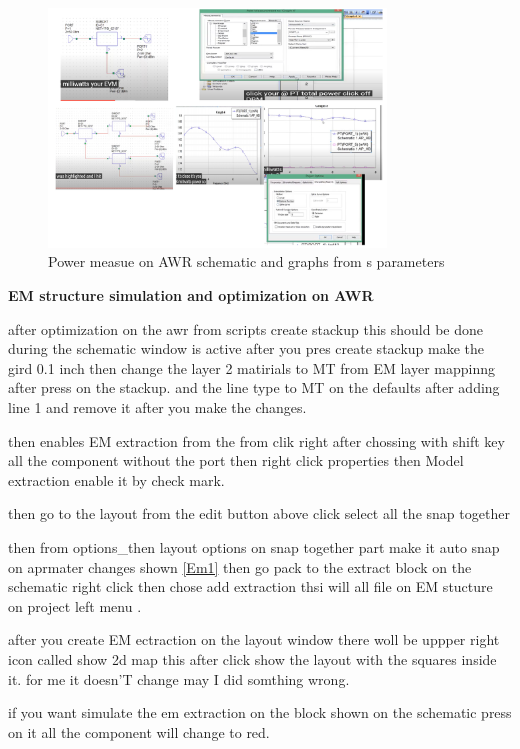 \documentclass{article}
\begin{document}
\begin{itemize}
\begin{figure}[H]
    \centering
    \includegraphics[width=0.8\textwidth]{figures/power  ports 1.pdf}
    \caption{Power measue on AWR schematic and graphs from s parameters}
    \label{power1}
\end{figure}



\textbf{EM structure simulation  and optimization on AWR}

after optimization on the awr from scripts create stackup this should be  done during the schematic window is active
after you pres create stackup 
make the gird 0.1 inch  then change the layer 2 matirials to MT from EM layer mappinng after press on the stackup.
and the line type to MT on the defaults after adding line 1 and remove it after you make the changes.

then enables EM extraction from the  from clik right after chossing with shift key all the component without the port 
then right click properties then Model extraction enable it by check mark.


then go to the layout from the edit button above click select all the snap together 

then from options_then layout options  on snap together part make it auto snap on aprmater changes shown \cref{Em1}
then go pack to the extract block on the schematic right click then chose add extraction thsi will all file on EM stucture  on project left menu .

after you create EM ectraction on the layout window there woll be uppper right icon called show 2d map 
this after click show the layout with the squares inside it. for me it doesn'T change may I did somthing wrong.

if you want simulate the em extraction on the block shown on the schematic press on it all the component will  change to red.


\end{itemize}
\end{document}
